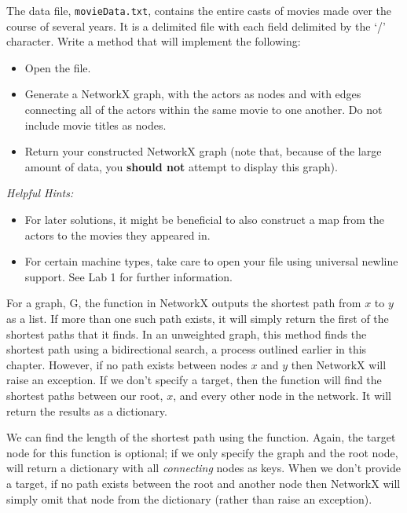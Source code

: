 \begin{problem}
The data file, \texttt{movieData.txt}, contains the entire casts of movies made over the course of several years. It is a delimited file with each field delimited by the `/' character. Write a method that will implement the following:
\begin{itemize}
\item Open the file.
\item Generate a NetworkX graph, with the actors as nodes and with edges connecting all of the actors within the same movie to one another. Do not include movie titles as nodes.
\item Return your constructed NetworkX graph (note that, because of the large amount of data, you \textbf{should not} attempt to display this graph).
\end{itemize}
\emph{Helpful Hints:}
\begin{itemize}
\item For later solutions, it might be beneficial to also construct a map from the actors to the movies they appeared in.
\item For certain machine types, take care to open your file using universal newline support. See Lab 1 for further information.
\end{itemize}
\end{problem}

For a graph, G, the  function in NetworkX outputs 
the shortest path from $x$ to $y$ as a list. If more than one such path exists,
it will simply return the first of the shortest paths that it finds. In an 
unweighted graph, this method finds the shortest path using a bidirectional search, 
a process outlined earlier in this chapter. However, if no path exists between nodes
$x$ and $y$ then NetworkX will raise an exception. If we don't specify a 
target, then the function will find the shortest paths between our root, 
$x$, and every other node in the network.  It will return the results as a dictionary. 


We can find the length of the shortest path using the  
function. Again, the target node for this function is optional; if we only
specify the graph and the root node,  will return a dictionary
with all \emph{connecting} nodes as keys. When we don't provide a target, if no path exists between the root 
and another node then NetworkX will simply omit that node from the dictionary (rather than raise an exception).

